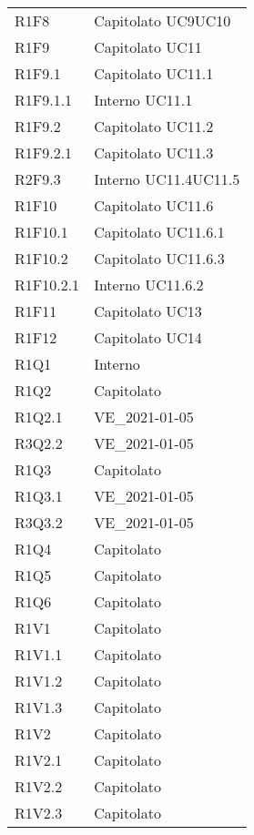 {\begin{longtable}{C{3cm} C{12.5cm}}

R1F8 & Capitolato \quad UC9\quad UC10\\


R1F9 & Capitolato \quad UC11 \\
R1F9.1 & Capitolato \quad UC11.1\\
R1F9.1.1 & Interno \quad UC11.1\\
R1F9.2 & Capitolato \quad UC11.2\\
R1F9.2.1 & Capitolato \quad UC11.3\\
R2F9.3 & Interno \quad UC11.4\quad UC11.5\\


R1F10 & Capitolato \quad UC11.6\\
R1F10.1 & Capitolato \quad UC11.6.1\\
R1F10.2 & Capitolato \quad UC11.6.3\\
R1F10.2.1 & Interno \quad UC11.6.2 \\


R1F11 & Capitolato \quad UC13\\
R1F12 & Capitolato \quad UC14\\


R1Q1 & Interno \\
R1Q2 & Capitolato \\
R1Q2.1 & VE\_2021-01-05 \\
R3Q2.2 & VE\_2021-01-05 \\
R1Q3 & Capitolato \\
R1Q3.1 & VE\_2021-01-05 \\
R3Q3.2 & VE\_2021-01-05 \\
R1Q4 & Capitolato \\
R1Q5 & Capitolato \\
R1Q6 & Capitolato \\


R1V1 & Capitolato \\
R1V1.1 & Capitolato \\
R1V1.2 & Capitolato \\
R1V1.3 & Capitolato \\


R1V2 & Capitolato \\
R1V2.1 & Capitolato \\
R1V2.2 & Capitolato \\
R1V2.3 & Capitolato \\



\end{longtable}}

